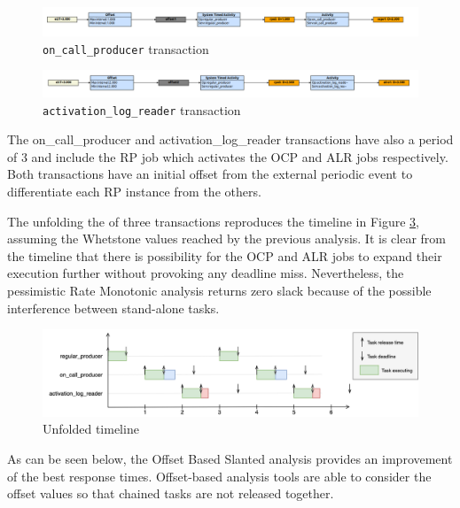 \documentclass{article}
\begin{document}
\begin{figure}[!htbp]
\centering
\includegraphics[width=6.5in]{images/transaction-ocp-offset}
\caption{\texttt{on\_call\_producer} transaction}
\label{transaction-ocp-offset}
\end{figure}

\begin{figure}[!htbp]
\centering
\includegraphics[width=6.5in]{images/transaction-alr-offset}
\caption{\texttt{activation\_log\_reader} transaction}
\label{transaction-alr-offset}
\end{figure}

The {on\_call\_producer} and {activation\_log\_reader} transactions have also a period of 3 and include the RP job which activates the OCP and ALR jobs respectively. Both transactions have an initial offset from the external periodic event to differentiate each RP instance from the others.

The unfolding the of three transactions reproduces the timeline in Figure \ref{timeline-offsets}, assuming the Whetstone values reached by the previous analysis. It is clear from the timeline that there is possibility for the OCP and ALR jobs to expand their execution further without provoking any deadline miss. Nevertheless, the pessimistic Rate Monotonic analysis returns zero slack because of the possible interference between stand-alone tasks.

\begin{figure}[!htbp]
\centering
\includegraphics[width=6.5in]{images/timeline-offsets}
\caption{Unfolded timeline}
\label{timeline-offsets}
\end{figure}

As can be seen below, the Offset Based Slanted analysis provides an improvement of the best response times. Offset-based analysis tools are able to consider the offset values so that chained tasks are not released together.
\end{document}
